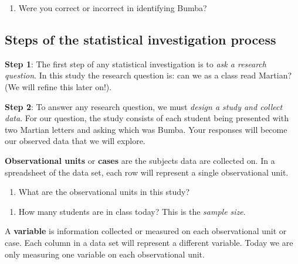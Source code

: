 \documentclass[
]{report}
\providecommand{\tightlist}{%
  \setlength{\itemsep}{0pt}\setlength{\parskip}{0pt}}
\begin{document}
\begin{enumerate}
\def\labelenumi{\arabic{enumi}.}
\tightlist
\item
  Were you correct or incorrect in identifying Bumba?
\end{enumerate}

\vspace{0.3in}

\hypertarget{steps-of-the-statistical-investigation-process}{%
\subsection*{Steps of the statistical investigation process}\label{steps-of-the-statistical-investigation-process}}

\textbf{Step 1}: The first step of any statistical investigation is to \emph{ask a research question}. In this study the research question is: can we as a class read Martian? (We will refine this later on!).

\textbf{Step 2}: To answer any research question, we must \emph{design a study and collect data}. For our question, the study consists of each student being presented with two Martian letters and asking which was Bumba. Your responses will become our observed data that we will explore.

\newpage

\textbf{Observational units} or \textbf{cases} are the subjects data are collected on. In a spreadsheet of the data set, each row will represent a single observational unit.

\begin{enumerate}
\def\labelenumi{\arabic{enumi}.}
\setcounter{enumi}{1}
\tightlist
\item
  What are the observational units in this study?
\end{enumerate}

\vspace{0.4in}

\begin{enumerate}
\def\labelenumi{\arabic{enumi}.}
\setcounter{enumi}{2}
\tightlist
\item
  How many students are in class today? This is the \emph{sample size}.
\end{enumerate}

\vspace{0.3in}

A \textbf{variable} is information collected or measured on each observational unit or case. Each column in a data set will represent a different variable. Today we are only measuring one variable on each observational unit.
\end{document}
